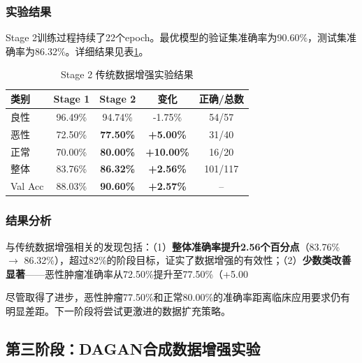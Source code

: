 \subsubsection{实验结果}

Stage 2训练过程持续了22个epoch。最优模型的验证集准确率为90.60\%，测试集准确率为86.32\%。详细结果见表\ref{tbl:stage2_results}。

\begin{table}[htb]
    \centering
    \caption{Stage 2 传统数据增强实验结果}
    \label{tbl:stage2_results}
    \begin{tabular}{lcccc}
        \toprule
        类别 & Stage 1 & Stage 2 & 变化 & 正确/总数 \\
        \midrule
        良性    & 96.49\% & 94.74\% & -1.75\% & 54/57 \\
        恶性    & 72.50\% & \textbf{77.50\%} & \textbf{+5.00\%} & 31/40 \\
        正常    & 70.00\% & \textbf{80.00\%} & \textbf{+10.00\%} & 16/20 \\
        \midrule
        整体    & 83.76\% & \textbf{86.32\%} & \textbf{+2.56\%} & 101/117 \\
        Val Acc & 88.03\% & \textbf{90.60\%} & \textbf{+2.57\%} & -- \\
        \bottomrule
    \end{tabular}
\end{table}

\subsubsection{结果分析}

与传统数据增强相关的发现包括：（1）\textbf{整体准确率提升2.56个百分点}（83.76\% $\rightarrow$ 86.32\%），超过82\%的阶段目标，证实了数据增强的有效性；（2）\textbf{少数类改善显著}——恶性肿瘤准确率从72.50\%提升至77.50\%（+5.00%

尽管取得了进步，恶性肿瘤77.50\%和正常80.00\%的准确率距离临床应用要求仍有明显差距。下一阶段将尝试更激进的数据扩充策略。


\subsection{第三阶段：DAGAN合成数据增强实验}

